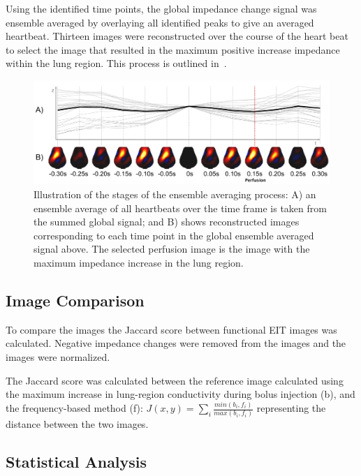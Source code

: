 Using the identified time points, the global impedance change signal 
was ensemble averaged by overlaying all identified peaks 
to give an averaged heartbeat. Thirteen images were reconstructed over the 
course of the heart beat to select the image that resulted in the maximum 
positive increase impedance within the lung region. This process is outlined 
in~.

\begin{figure}[H]
\centering
\includegraphics[width=\textwidth]{chapter3-perfusion_analysis/imgs/fig-methodsTime.pdf}
\caption[Ensemble averaging analysis]{\label{fig:timeAnalysis}%
Illustration of the stages of the ensemble averaging process:
A) an ensemble average of all heartbeats over the time frame is taken from the 
summed global signal; and 
B) shows reconstructed images corresponding to each time point 
in the global ensemble averaged signal above.
The selected perfusion image is the image with the maximum impedance increase in the 
lung region.
}

\end{figure}

\subsection{Image Comparison}

To compare the images the Jaccard 
score between functional EIT images was calculated. 
Negative impedance changes were removed from the images
and the images were normalized.

The Jaccard score was calculated between the reference image 
calculated using the maximum increase in lung-region conductivity during 
bolus injection (b), and the frequency-based method (f):
$J(x,y) = \sum_{i}\frac{min(b_i,f_i)}{max(b_i,f_i)}$
representing the distance between the two images.

\subsection{Statistical Analysis}

